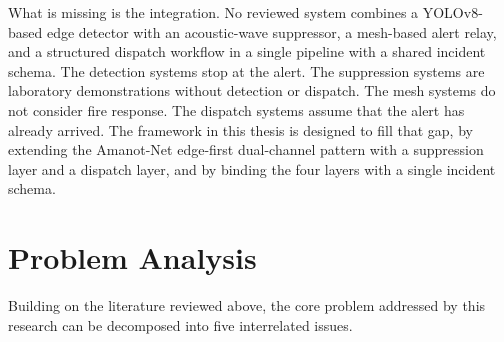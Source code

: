 What is missing is the integration. No reviewed system combines a YOLOv8-based edge detector with an acoustic-wave suppressor, a mesh-based alert relay, and a structured dispatch workflow in a single pipeline with a shared incident schema. The detection systems stop at the alert. The suppression systems are laboratory demonstrations without detection or dispatch. The mesh systems do not consider fire response. The dispatch systems assume that the alert has already arrived. The framework in this thesis is designed to fill that gap, by extending the Amanot-Net edge-first dual-channel pattern with a suppression layer and a dispatch layer, and by binding the four layers with a single incident schema.

\section{Problem Analysis}

Building on the literature reviewed above, the core problem addressed by this research can be decomposed into five interrelated issues.

